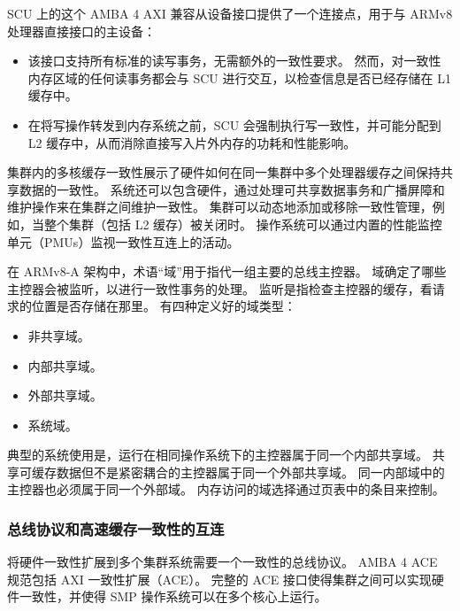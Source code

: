 SCU 上的这个 AMBA 4
AXI 兼容从设备接口提供了一个连接点，用于与 ARMv8 处理器直接接口的主设备：

\begin{itemize}
\item
  该接口支持所有标准的读写事务，无需额外的一致性要求。
  然而，对一致性内存区域的任何读事务都会与 SCU 进行交互，以检查信息是否已经存储在 L1 缓存中。
\item
  在将写操作转发到内存系统之前，SCU 会强制执行写一致性，并可能分配到 L2 缓存中，从而消除直接写入片外内存的功耗和性能影响。
\end{itemize}


集群内的多核缓存一致性展示了硬件如何在同一集群中多个处理器缓存之间保持共享数据的一致性。
系统还可以包含硬件，通过处理可共享数据事务和广播屏障和维护操作来在集群之间维护一致性。
集群可以动态地添加或移除一致性管理，例如，当整个集群（包括 L2 缓存）被关闭时。
操作系统可以通过内置的性能监控单元（PMUs）监视一致性互连上的活动。


在 ARMv8-A 架构中，术语“域”用于指代一组主要的总线主控器。
域确定了哪些主控器会被监听，以进行一致性事务的处理。
监听是指检查主控器的缓存，看请求的位置是否存储在那里。
有四种定义好的域类型：

\begin{itemize}
\item
  非共享域。
\item
  内部共享域。
\item
  外部共享域。
\item
  系统域。
\end{itemize}

典型的系统使用是，运行在相同操作系统下的主控器属于同一个内部共享域。
共享可缓存数据但不是紧密耦合的主控器属于同一个外部共享域。
同一内部域中的主控器也必须属于同一个外部域。
内存访问的域选择通过页表中的条目来控制。


\subsubsection{总线协议和高速缓存一致性的互连}

将硬件一致性扩展到多个集群系统需要一个一致性的总线协议。
AMBA 4
ACE 规范包括 AXI 一致性扩展（ACE）。
完整的 ACE 接口使得集群之间可以实现硬件一致性，并使得 SMP 操作系统可以在多个核心上运行。


